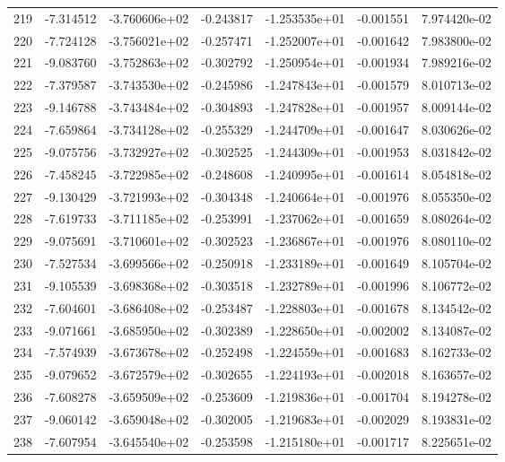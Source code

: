\begin{tabular}{rrrrrrr}
 219 &  -7.314512 & -3.760606e+02 & -0.243817 & -1.253535e+01 &   -0.001551 &  7.974420e-02 \\
 220 &  -7.724128 & -3.756021e+02 & -0.257471 & -1.252007e+01 &   -0.001642 &  7.983800e-02 \\
 221 &  -9.083760 & -3.752863e+02 & -0.302792 & -1.250954e+01 &   -0.001934 &  7.989216e-02 \\
 222 &  -7.379587 & -3.743530e+02 & -0.245986 & -1.247843e+01 &   -0.001579 &  8.010713e-02 \\
 223 &  -9.146788 & -3.743484e+02 & -0.304893 & -1.247828e+01 &   -0.001957 &  8.009144e-02 \\
 224 &  -7.659864 & -3.734128e+02 & -0.255329 & -1.244709e+01 &   -0.001647 &  8.030626e-02 \\
 225 &  -9.075756 & -3.732927e+02 & -0.302525 & -1.244309e+01 &   -0.001953 &  8.031842e-02 \\
 226 &  -7.458245 & -3.722985e+02 & -0.248608 & -1.240995e+01 &   -0.001614 &  8.054818e-02 \\
 227 &  -9.130429 & -3.721993e+02 & -0.304348 & -1.240664e+01 &   -0.001976 &  8.055350e-02 \\
 228 &  -7.619733 & -3.711185e+02 & -0.253991 & -1.237062e+01 &   -0.001659 &  8.080264e-02 \\
 229 &  -9.075691 & -3.710601e+02 & -0.302523 & -1.236867e+01 &   -0.001976 &  8.080110e-02 \\
 230 &  -7.527534 & -3.699566e+02 & -0.250918 & -1.233189e+01 &   -0.001649 &  8.105704e-02 \\
 231 &  -9.105539 & -3.698368e+02 & -0.303518 & -1.232789e+01 &   -0.001996 &  8.106772e-02 \\
 232 &  -7.604601 & -3.686408e+02 & -0.253487 & -1.228803e+01 &   -0.001678 &  8.134542e-02 \\
 233 &  -9.071661 & -3.685950e+02 & -0.302389 & -1.228650e+01 &   -0.002002 &  8.134087e-02 \\
 234 &  -7.574939 & -3.673678e+02 & -0.252498 & -1.224559e+01 &   -0.001683 &  8.162733e-02 \\
 235 &  -9.079652 & -3.672579e+02 & -0.302655 & -1.224193e+01 &   -0.002018 &  8.163657e-02 \\
 236 &  -7.608278 & -3.659509e+02 & -0.253609 & -1.219836e+01 &   -0.001704 &  8.194278e-02 \\
 237 &  -9.060142 & -3.659048e+02 & -0.302005 & -1.219683e+01 &   -0.002029 &  8.193831e-02 \\
 238 &  -7.607954 & -3.645540e+02 & -0.253598 & -1.215180e+01 &   -0.001717 &  8.225651e-02 \\

\end{tabular}
